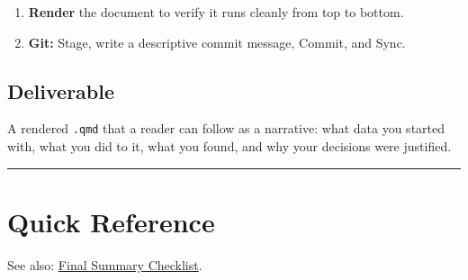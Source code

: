 \documentclass[
  letterpaper,
  DIV=11,
  numbers=noendperiod,
  oneside]{scrreprt}
\providecommand{\tightlist}{%
  \setlength{\itemsep}{0pt}\setlength{\parskip}{0pt}}
\begin{document}
\begin{enumerate}
  \begin{itemize}
  \tightlist
  \item
    A \texttt{\#} comment stating what you asked the AI and what you
    verified.
  \item
    A Markdown paragraph below interpreting the result.
  \end{itemize}
\item
  \textbf{Render} the document to verify it runs cleanly from top to
  bottom.
\item
  \textbf{Git:} Stage, write a descriptive commit message, Commit, and
  Sync.
\end{enumerate}

\subsection*{Deliverable}\label{deliverable}

A rendered \texttt{.qmd} that a reader can follow as a narrative: what
data you started with, what you did to it, what you found, and why your
decisions were justified.

\begin{center}\rule{0.5\linewidth}{0.5pt}\end{center}

\section*{Quick Reference}\label{quick-reference}


See also: \href{r10-final-checklist.qmd}{Final Summary Checklist}.
\end{document}
